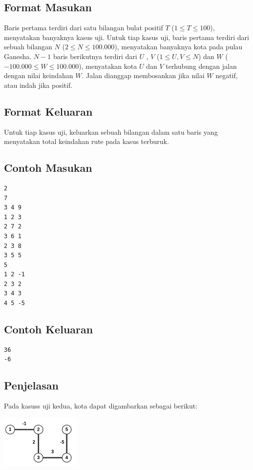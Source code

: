 \documentclass{article}
\begin{document}
\subsection*{Format Masukan}
Baris pertama terdiri dari satu bilangan bulat positif $T$ ($1 \leq T \leq 100$), menyatakan banyaknya kasus uji.
Untuk tiap kasus uji, baris pertama terdiri dari sebuah bilangan $N$ ($2 \leq N \leq 100.000$), menyatakan banyaknya kota pada pulau Ganesha.
$N-1$ baris berikutnya terdiri dari $U$ , $V$ ($1 \leq U, V \leq N$) dan $W$ ($-100.000 \leq W \leq 100.000$), menyatakan kota $U$ dan $V$ terhubung dengan jalan dengan nilai keindahan $W$.
Jalan dianggap membosankan jika nilai $W$ negatif, atau indah jika positif.

\subsection*{Format Keluaran}
Untuk tiap kasus uji, keluarkan sebuah bilangan dalam satu baris yang menyatakan total keindahan rute pada kasus terburuk.

\pagebreak

\begin{multicols}{2}
\subsection*{Contoh Masukan}
\begin{lstlisting}
2
7
3 4 9
1 2 3
2 7 2
3 6 1
2 3 8
3 5 5
5
1 2 -1
2 3 2
3 4 3
4 5 -5
\end{lstlisting}
\columnbreak
\subsection*{Contoh Keluaran}
\begin{lstlisting}
36
-6
\end{lstlisting}
\vfill
\null
\end{multicols}

\subsection*{Penjelasan}
Pada kasuss uji kedua, kota dapat digambarkan sebagai berikut:

\includegraphics[width=150px]{sample-2}
\end{document}
